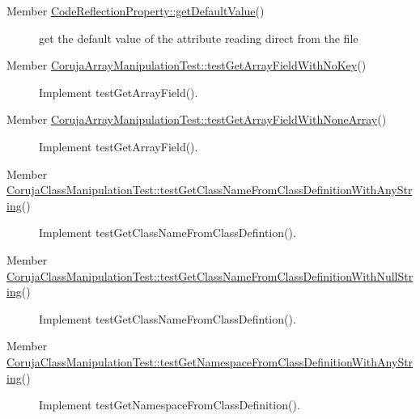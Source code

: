 \label{todo__todo000003}
\hypertarget{todo__todo000003}{}
 \begin{description}
\item[Member \hyperlink{class_code_reflection_property_6f0cc1d1c9d11ca1494665d52b8322d0}{CodeReflectionProperty::getDefaultValue}() ]get the default value of the attribute reading direct from the file \end{description}


\label{todo__todo000004}
\hypertarget{todo__todo000004}{}
 \begin{description}
\item[Member \hyperlink{class_coruja_array_manipulation_test_2ce7f6b702b5c5759caa833553685277}{CorujaArrayManipulationTest::testGetArrayFieldWithNoKey}() ]Implement testGetArrayField(). \end{description}


\label{todo__todo000005}
\hypertarget{todo__todo000005}{}
 \begin{description}
\item[Member \hyperlink{class_coruja_array_manipulation_test_0ea85caeb9df2acc96a2925cccf66657}{CorujaArrayManipulationTest::testGetArrayFieldWithNoneArray}() ]Implement testGetArrayField(). \end{description}


\label{todo__todo000007}
\hypertarget{todo__todo000007}{}
 \begin{description}
\item[Member \hyperlink{class_coruja_class_manipulation_test_ff7a03d9aea2786f8cb04b38b194b53f}{CorujaClassManipulationTest::testGetClassNameFromClassDefinitionWithAnyString}() ]Implement testGetClassNameFromClassDefintion(). \end{description}


\label{todo__todo000006}
\hypertarget{todo__todo000006}{}
 \begin{description}
\item[Member \hyperlink{class_coruja_class_manipulation_test_597f3fd79250591e51a07532b84520fa}{CorujaClassManipulationTest::testGetClassNameFromClassDefinitionWithNullString}() ]Implement testGetClassNameFromClassDefintion(). \end{description}


\label{todo__todo000009}
\hypertarget{todo__todo000009}{}
 \begin{description}
\item[Member \hyperlink{class_coruja_class_manipulation_test_53d2c075bd350927691fcd7171e6cf44}{CorujaClassManipulationTest::testGetNamespaceFromClassDefinitionWithAnyString}() ]Implement testGetNamespaceFromClassDefinition(). \end{description}


